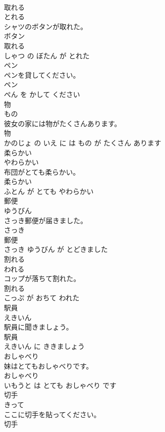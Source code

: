 \documentclass[8pt]{extreport}
\begin{document}
\begin{CJK}{UTF8}{min}
\\	取れる	
\\	とれる			
\\	シャツのボタンが取れた。	
\\	ボタン 
\\	取れる 
\\	しゃつ の ぼたん が とれた			
\\	ペン	
\\	ペンを貸してください。	
\\	ペン 
\\	ぺん を かして ください			
\\	物	
\\	もの			
\\	彼女の家には物がたくさんあります。	
\\	物 
\\	かのじょ の いえ に は もの が たくさん あります			
\\	柔らかい	
\\	やわらかい			
\\	布団がとても柔らかい。	
\\	柔らかい 
\\	ふとん が とても やわらかい			
\\	郵便	
\\	ゆうびん			
\\	さっき郵便が届きました。	
\\	さっき 
\\	郵便 
\\	さっき ゆうびん が とどきました			
\\	割れる	
\\	われる			
\\	コップが落ちて割れた。	
\\	割れる 
\\	こっぷ が おちて われた			
\\	駅員	
\\	えきいん			
\\	駅員に聞きましょう。	
\\	駅員 
\\	えきいん に ききましょう			
\\	おしゃべり	
\\	妹はとてもおしゃべりです。	
\\	おしゃべり 
\\	いもうと は とても おしゃべり です			
\\	切手	
\\	きって			
\\	ここに切手を貼ってください。	
\\	切手 

\end{CJK}
\end{document}
